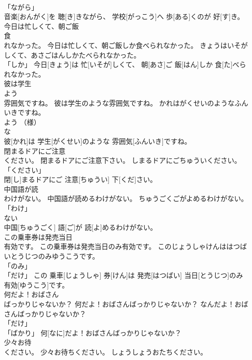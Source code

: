\documentclass[8pt]{extreport}
\begin{document}
\begin{CJK}{UTF8}{min}
\\	「ながら」 
\\	音楽[おんがく]を 聴[き]きながら、 学校[がっこう]へ 歩[ある]くのが 好[す]き。		
\\	今日は忙しくて、朝ご飯
\\	食
\\	れなかった。	今日は忙しくて、朝ご飯しか食べられなかった。	きょうはいそがしくて、あさごはんしかたべられなかった。	
\\	「しか」	今日[きょう]は 忙[いそが]しくて、 朝[あさ]ご 飯[はん]しか 食[た]べられなかった。		
\\	彼は学生
\\	よう
\\	雰囲気ですね。	彼は学生のような雰囲気ですね。	かれはがくせいのようなふんいきですね。	
\\	よう （様） 
\\	な 
\\	彼[かれ]は 学生[がくせい]のような 雰囲気[ふんいき]ですね。		
\\	閉まるドアにご注意
\\	ください。	閉まるドアにご注意下さい。	しまるドアにごちゅういください。	
\\	「ください」 
\\	閉[し]まるドアにご 注意[ちゅうい] 下[くだ]さい。		
\\	中国語が読
\\	わけがない。	中国語が読めるわけがない。	ちゅうごくごがよめるわけがない。	
\\	「わけ」 
\\	ない 
\\	中国[ちゅうごく] 語[ご]が 読[よ]めるわけがない。		
\\	この乗車券は発売当日
\\	有効です。	この乗車券は発売当日のみ有効です。	このじょうしゃけんははつばいとうじつのみゆうこうです。	
\\	「のみ」 
\\	「だけ」	この 乗車[じょうしゃ] 券[けん]は 発売[はつばい] 当日[とうじつ]のみ 有効[ゆうこう]です。		
\\	何だよ！おばさん
\\	ばっかりじゃないか？	何だよ！おばさんばっかりじゃないか？	なんだよ！おばさんばっかりじゃないか？	
\\	「だけ」 
\\	「ばかり」	何[なに]だよ！おばさんばっかりじゃないか？		
\\	少々お待
\\	ください。	少々お待ちください。	しょうしょうおたちください。	

\end{CJK}
\end{document}
